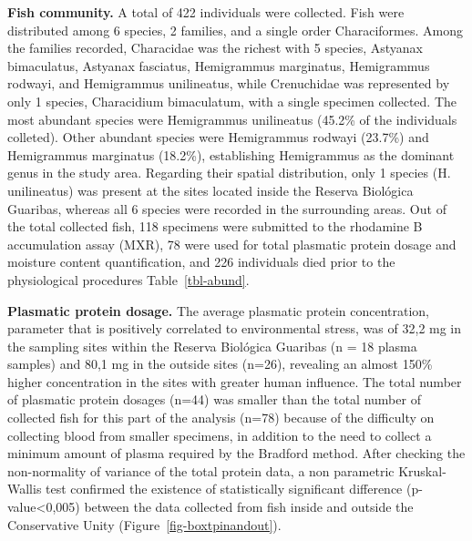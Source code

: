 \documentclass[
  american,
  letterpaper,
  DIV=11,
  numbers=noendperiod]{scrartcl}
\begin{document}
\textbf{Fish community.} A total of 422 individuals were collected. Fish
were distributed among 6 species, 2 families, and a single order
Characiformes. Among the families recorded, Characidae was the richest
with 5 species, Astyanax bimaculatus, Astyanax fasciatus, Hemigrammus
marginatus, Hemigrammus rodwayi, and Hemigrammus unilineatus, while
Crenuchidae was represented by only 1 species, Characidium bimaculatum,
with a single specimen collected. The most abundant species were
Hemigrammus unilineatus (45.2\% of the individuals colleted). Other
abundant species were Hemigrammus rodwayi (23.7\%) and Hemigrammus
marginatus (18.2\%), establishing Hemigrammus as the dominant genus in
the study area. Regarding their spatial distribution, only 1 species (H.
unilineatus) was present at the sites located inside the Reserva
Biológica Guaribas, whereas all 6 species were recorded in the
surrounding areas. Out of the total collected fish, 118 specimens were
submitted to the rhodamine B accumulation assay (MXR), 78 were used for
total plasmatic protein dosage and moisture content quantification, and
226 individuals died prior to the physiological procedures
Table~\ref{tbl-abund}.

\textbf{Plasmatic protein dosage.} The average plasmatic protein
concentration, parameter that is positively correlated to environmental
stress, was of 32,2 mg in the sampling sites within the Reserva
Biológica Guaribas (n = 18 plasma samples) and 80,1 mg in the outside
sites (n=26), revealing an almost 150\% higher concentration in the
sites with greater human influence. The total number of plasmatic
protein dosages (n=44) was smaller than the total number of collected
fish for this part of the analysis (n=78) because of the difficulty on
collecting blood from smaller specimens, in addition to the need to
collect a minimum amount of plasma required by the Bradford method.
After checking the non-normality of variance of the total protein data,
a non parametric Kruskal-Wallis test confirmed the existence of
statistically significant difference (p-value\textless0,005) between the
data collected from fish inside and outside the Conservative Unity
(Figure~\ref{fig-boxtpinandout}).
\end{document}
